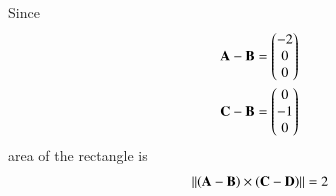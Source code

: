 Since
\begin{align}
\mathbf{A} - \mathbf{B} &= \begin{pmatrix}-2\\0\\0\end{pmatrix}\\
\mathbf{C} -\mathbf{B} &= \begin{pmatrix}0\\-1\\0\end{pmatrix}
\end{align}
area of the rectangle is
\begin{align}
 \left\lVert\left(\mathbf{A} -\mathbf{B}\right) \times \left(\mathbf{C}-\mathbf{D}\right)\right\rVert
= 2
\end{align} 

